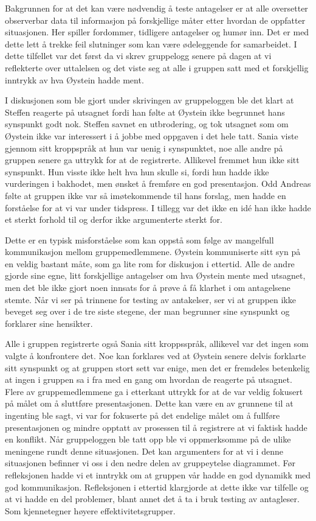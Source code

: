\documentclass[a4paper,norsk,oneside]{article}
\begin{document}
Bakgrunnen for at det kan være nødvendig å teste antagelser er at alle oversetter observerbar data til informasjon på forskjellige måter etter hvordan de oppfatter situasjonen. Her spiller fordommer, tidligere antagelser og humør inn. Det er med dette lett å trekke feil slutninger som kan være ødeleggende for samarbeidet. I dette tilfellet var det først da vi skrev gruppelogg senere på dagen at vi reflekterte over uttalelsen og det viste seg at alle i gruppen satt med et forskjellig inntrykk av hva Øystein hadde ment.

I diskusjonen som ble gjort under skrivingen av gruppeloggen ble det klart at Steffen reagerte på utsagnet fordi han følte at Øystein ikke begrunnet hans synspunkt godt nok. Steffen savnet en utbrodering, og tok utsagnet som om Øystein ikke var interessert i å jobbe med oppgaven i det hele tatt. Sania viste gjennom sitt kroppspråk at hun var uenig i synspunktet, noe alle andre på gruppen senere ga uttrykk for at de registrerte. Allikevel fremmet hun ikke sitt synspunkt. Hun visste ikke helt hva hun skulle si, fordi hun hadde ikke vurderingen i bakhodet, men ønsket å fremføre en god presentasjon. Odd Andreas følte at gruppen ikke var så imøtekommende til hans forslag, men hadde en forståelse for at vi var under tidspress. I tillegg var det ikke en idé han ikke hadde et sterkt forhold til og derfor ikke argumenterte sterkt for.

Dette er en typisk misforståelse som kan oppstå som følge av mangelfull kommunikasjon mellom gruppemedlemmene. Øystein kommuniserte sitt syn på en veldig bastant måte, som ga lite rom for diskusjon i ettertid. Alle de andre gjorde sine egne, litt forskjellige antagelser om hva Øystein mente med utsagnet, men det ble ikke gjort noen innsats for å prøve å få klarhet i om antagelsene stemte. Når vi ser på trinnene for testing av antakelser, ser vi at gruppen ikke beveget seg over i de tre siste stegene, der man begrunner sine synspunkt og forklarer sine hensikter.

Alle i gruppen registrerte også Sania sitt kroppsspråk, allikevel var det ingen som valgte å konfrontere det. Noe kan forklares ved at Øystein senere delvis forklarte sitt synspunkt og at gruppen stort sett var enige, men det er fremdeles betenkelig at ingen i gruppen sa i fra med en gang om hvordan de reagerte på utsagnet. Flere av gruppemedlemmene ga i etterkant uttrykk for at de var veldig fokusert på målet om å sluttføre presentasjonen. Dette kan være en av grunnene til at ingenting ble sagt, vi var for fokuserte på det endelige målet om å fullføre presentasjonen og mindre opptatt av prosessen til å registrere at vi faktisk hadde en konflikt. Når gruppeloggen ble tatt opp ble vi oppmerksomme på de ulike meningene rundt denne situasjonen. Det kan argumenters for at vi i denne situasjonen befinner vi oss i den nedre delen av gruppeytelse diagrammet. Før refleksjonen hadde vi et inntrykk om at gruppen vår hadde en god dynamikk med god kommunikasjon. Refleksjonen i ettertid klargjorde at dette ikke var tilfelle og at vi hadde en del problemer, blant annet det å ta i bruk testing av antagleser. Som kjennetegner høyere effektivitetsgrupper.
\end{document}

